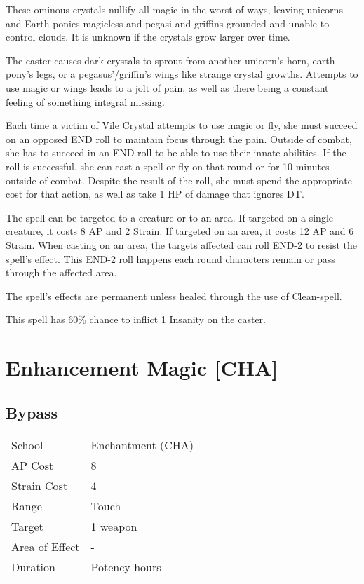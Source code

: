 \documentclass[11pt,a4paper,twocolumn]{book}
\begin{document}
These ominous crystals nullify all magic in the worst of ways, leaving unicorns and Earth ponies magicless and pegasi and griffins grounded and unable to control clouds. It is unknown if the crystals grow larger over time.

The caster causes dark crystals to sprout from another unicorn's horn, earth pony's legs, or a pegasus'/griffin's wings like strange crystal growths. Attempts to use magic or wings leads to a jolt of pain, as well as there being a constant feeling of something integral missing.

Each time a victim of Vile Crystal attempts to use magic or fly, she must succeed on an opposed END roll to maintain focus through the pain. Outside of combat, she has to succeed in an END roll to be able to use their innate abilities. If the roll is successful, she can cast a spell or fly on that round or for 10 minutes outside of combat. Despite the result of the roll, she must spend the appropriate cost for that action, as well as take 1 HP of damage that ignores DT.

The spell can be targeted to a creature or to an area. If targeted on a single creature, it costs 8 AP and 2 Strain. If targeted on an area, it costs 12 AP and 6 Strain. When casting on an area, the targets affected can roll END-2 to resist the spell's effect. This END-2 roll happens each round characters remain or pass through the affected area.

The spell's effects are permanent unless healed through the use of Clean-spell.

This spell has 60\% chance to inflict 1 Insanity on the caster.


\section*{Enhancement Magic [CHA]}

\subsection*{Bypass}
{
	\begin{tabu} to 75mm{| X[l,4] | X[l,7] |}
		\hline
		School 			& Enchantment (CHA) 	\\
		AP Cost	      	& 8 					\\
		Strain Cost     & 4 					\\
		Range     		& Touch 				\\
		Target      	& 1 weapon 				\\
		Area of Effect  & - 	 				\\
		Duration     	& Potency hours 		\\ \hline
	\end{tabu}
	
}
\end{document}
